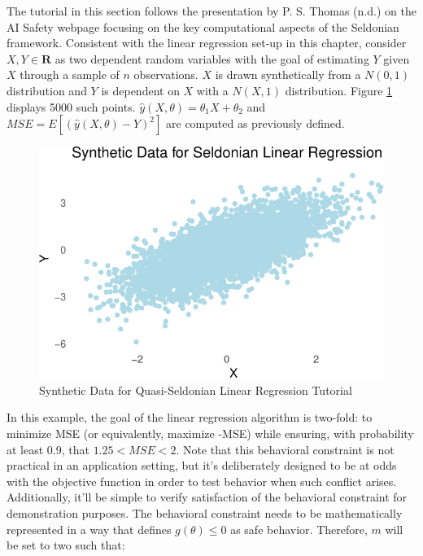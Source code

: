 \documentclass[12pt, twoside]{amherstthesis}
\begin{document}
The tutorial in this section follows the presentation by P. S. Thomas (n.d.) on the AI Safety webpage focusing on the key computational aspects of the Seldonian framework. Consistent with the linear regression set-up in this chapter, consider \(X, Y \in \textbf{R}\) as two dependent random variables with the goal of estimating \(Y\) given \(X\) through a sample of \(n\) observations. \(X\) is drawn synthetically from a \(N(0,1)\) distribution and \(Y\) is dependent on \(X\) with a \(N(X,1)\) distribution. Figure \ref{fig:fig2} displays 5000 such points. \(\hat{y}(X, \theta) = \theta_1X+\theta_2\) and \(MSE = E[(\hat{y}(X, \theta)-Y)^2]\) are computed as previously defined.
\begin{figure}

{\centering \includegraphics{Dasha-Asienga_StatThesis_files/figure-latex/fig2-1} 

}

\caption{Synthetic Data for Quasi-Seldonian Linear Regression Tutorial}\label{fig:fig2}
\end{figure}
In this example, the goal of the linear regression algorithm is two-fold: to minimize MSE (or equivalently, maximize -MSE) while ensuring, with probability at least 0.9, that \(1.25 < MSE < 2\). Note that this behavioral constraint is not practical in an application setting, but it's deliberately designed to be at odds with the objective function in order to test behavior when such conflict arises. Additionally, it'll be simple to verify satisfaction of the behavioral constraint for demonstration purposes. The behavioral constraint needs to be mathematically represented in a way that defines \(g(\theta) \leq 0\) as safe behavior. Therefore, \(m\) will be set to two such that:
\end{document}
